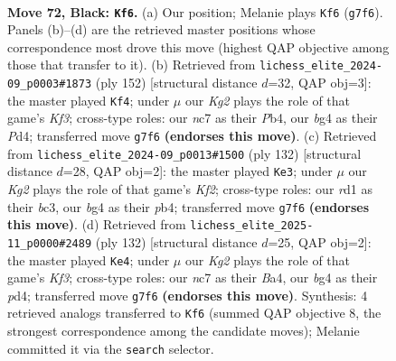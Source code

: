 \documentclass[11pt]{article}
\begin{document}
\clearpage

\begin{figure}[p]\centering
\begin{subfigure}{0.46\textwidth}\centering
\resizebox{\linewidth}{!}{%
\newchessgame
\chessboard[
  setfen={8/PbN3k1/8/n7/1p3PB1/6P1/5K1P/3R4 b - - 13 72},
  showmover=false,
  pgfstyle=straightmove, color=movearrow, markmove={g7-f6}
]}
\caption{}
\end{subfigure}\hfill
\begin{subfigure}{0.46\textwidth}\centering
\resizebox{\linewidth}{!}{%
\newchessgame
\chessboard[
  setfen={8/3bk3/2p3Bp/1p1p4/1P1P3P/5K2/8/8 w - - 12 77},
  showmover=false,
  pgfstyle=straightmove, color=movearrow, markmove={f3-f4}
]}
\caption{}
\end{subfigure}
\\[4pt]
\begin{subfigure}{0.46\textwidth}\centering
\resizebox{\linewidth}{!}{%
\newchessgame
\chessboard[
  setfen={8/7p/7P/N2k2p1/1p2p1P1/2bp4/5K2/8 w - - 0 67},
  showmover=false,
  pgfstyle=straightmove, color=movearrow, markmove={f2-e3}
]}
\caption{}
\end{subfigure}\hfill
\begin{subfigure}{0.46\textwidth}\centering
\resizebox{\linewidth}{!}{%
\newchessgame
\chessboard[
  setfen={8/2b4p/4p1p1/p5k1/B2p4/5K1P/8/8 w - - 3 67},
  showmover=false,
  pgfstyle=straightmove, color=movearrow, markmove={f3-e4}
]}
\caption{}
\end{subfigure}
\caption{\textbf{Move 72, Black: \texttt{Kf6}.} (a) Our position; Melanie plays \texttt{Kf6} (\texttt{g7f6}). Panels (b)--(d) are the retrieved master positions whose correspondence most drove this move (highest QAP objective among those that transfer to it). (b) Retrieved from \texttt{lichess\_elite\_2024-09\_p0003\#1873} (ply 152) [structural distance $d$=32, QAP obj=3]: the master played \texttt{Kf4}; under $\mu$ our \emph{Kg2} plays the role of that game's \emph{Kf3}; cross-type roles: our \emph{n}c7 as their \emph{P}b4, our \emph{b}g4 as their \emph{P}d4; transferred move \texttt{g7f6} \textbf{(endorses this move)}. (c) Retrieved from \texttt{lichess\_elite\_2024-09\_p0013\#1500} (ply 132) [structural distance $d$=28, QAP obj=2]: the master played \texttt{Ke3}; under $\mu$ our \emph{Kg2} plays the role of that game's \emph{Kf2}; cross-type roles: our \emph{r}d1 as their \emph{b}c3, our \emph{b}g4 as their \emph{p}b4; transferred move \texttt{g7f6} \textbf{(endorses this move)}. (d) Retrieved from \texttt{lichess\_elite\_2025-11\_p0000\#2489} (ply 132) [structural distance $d$=25, QAP obj=2]: the master played \texttt{Ke4}; under $\mu$ our \emph{Kg2} plays the role of that game's \emph{Kf3}; cross-type roles: our \emph{n}c7 as their \emph{B}a4, our \emph{b}g4 as their \emph{p}d4; transferred move \texttt{g7f6} \textbf{(endorses this move)}. Synthesis: 4 retrieved analogs transferred to \texttt{Kf6} (summed QAP objective 8, the strongest correspondence among the candidate moves); Melanie committed it via the \texttt{search} selector.}
\label{fig:thought-m143}
\end{figure}
\end{document}

